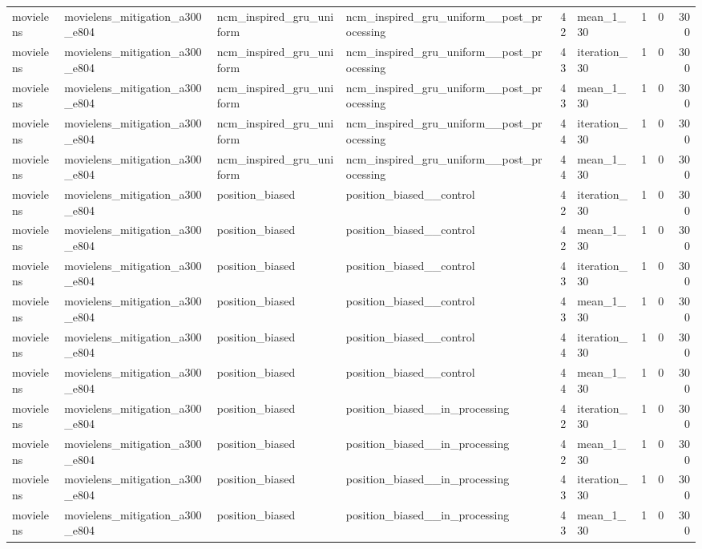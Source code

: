 \begin{table}[htbp!]
\begin{tabular}{llllrlrrr}
movielens & movielens\_mitigation\_a300\_e804 & ncm\_inspired\_gru\_uniform & ncm\_inspired\_gru\_uniform\_\_post\_processing & 42 & mean\_1\_30 & 1 & 0 & 300 \\
movielens & movielens\_mitigation\_a300\_e804 & ncm\_inspired\_gru\_uniform & ncm\_inspired\_gru\_uniform\_\_post\_processing & 43 & iteration\_30 & 1 & 0 & 300 \\
movielens & movielens\_mitigation\_a300\_e804 & ncm\_inspired\_gru\_uniform & ncm\_inspired\_gru\_uniform\_\_post\_processing & 43 & mean\_1\_30 & 1 & 0 & 300 \\
movielens & movielens\_mitigation\_a300\_e804 & ncm\_inspired\_gru\_uniform & ncm\_inspired\_gru\_uniform\_\_post\_processing & 44 & iteration\_30 & 1 & 0 & 300 \\
movielens & movielens\_mitigation\_a300\_e804 & ncm\_inspired\_gru\_uniform & ncm\_inspired\_gru\_uniform\_\_post\_processing & 44 & mean\_1\_30 & 1 & 0 & 300 \\
movielens & movielens\_mitigation\_a300\_e804 & position\_biased & position\_biased\_\_control & 42 & iteration\_30 & 1 & 0 & 300 \\
movielens & movielens\_mitigation\_a300\_e804 & position\_biased & position\_biased\_\_control & 42 & mean\_1\_30 & 1 & 0 & 300 \\
movielens & movielens\_mitigation\_a300\_e804 & position\_biased & position\_biased\_\_control & 43 & iteration\_30 & 1 & 0 & 300 \\
movielens & movielens\_mitigation\_a300\_e804 & position\_biased & position\_biased\_\_control & 43 & mean\_1\_30 & 1 & 0 & 300 \\
movielens & movielens\_mitigation\_a300\_e804 & position\_biased & position\_biased\_\_control & 44 & iteration\_30 & 1 & 0 & 300 \\
movielens & movielens\_mitigation\_a300\_e804 & position\_biased & position\_biased\_\_control & 44 & mean\_1\_30 & 1 & 0 & 300 \\
movielens & movielens\_mitigation\_a300\_e804 & position\_biased & position\_biased\_\_in\_processing & 42 & iteration\_30 & 1 & 0 & 300 \\
movielens & movielens\_mitigation\_a300\_e804 & position\_biased & position\_biased\_\_in\_processing & 42 & mean\_1\_30 & 1 & 0 & 300 \\
movielens & movielens\_mitigation\_a300\_e804 & position\_biased & position\_biased\_\_in\_processing & 43 & iteration\_30 & 1 & 0 & 300 \\
movielens & movielens\_mitigation\_a300\_e804 & position\_biased & position\_biased\_\_in\_processing & 43 & mean\_1\_30 & 1 & 0 & 300 \\

\end{tabular}
\end{table}
